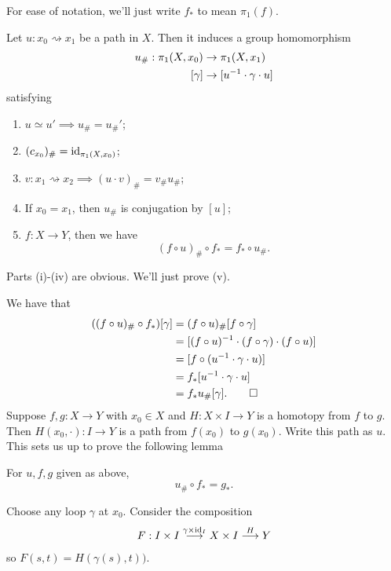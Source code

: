 \documentclass{article}
\begin{document}
\par
For ease of notation, we'll just write $ f_* $ to mean $ \pi_1(f) $.
\begin{proposition}
  Let $ u: x_0\rightsquigarrow x_1 $ be a path in $ X $. Then it induces a group homomorphism 
\begin{align*}
	u_\#: \pi_1(X,x_0) &\to \pi_1(X,x_1) \\
	[\gamma] &\to [{u}^{-1} \cdot \gamma \cdot u]
\end{align*}
satisfying
\begin{enumerate}
	\item $ u \simeq u' \implies u_\# = u_\#' $;
	\item $ (c_{x_0})_\# = \mathrm{id}_{\pi_1(X,x_0)} $;
	\item $ v: x_1\rightsquigarrow x_2\implies (u\cdot v)_\# = v_\# u_\# $;
	\item If $ x_0 = x_1 $, then $ u_\# $ is conjugation by $ [u] $;
	\item $ f:X\to Y $, then we have
		\[
			(f\circ u)_\# \circ f_* = f_* \circ u_\#.
		\]
\end{enumerate}
\end{proposition}
\pf Parts (i)-(iv) are obvious. We'll just prove (v).\par
We have that 
\begin{align*}
	((f\circ u)_\# \circ f_*)[\gamma] &= (f\circ u)_\#[f\circ \gamma] \\
					  &= [(f\circ u)^{-1} \cdot (f\circ \gamma) \cdot (f\circ u)]\\
					  &= [f\circ({u}^{-1} \cdot \gamma \cdot u)] \\
					  &= f_*[{u}^{-1} \cdot \gamma \cdot u] \\
					  &= f_* u_\#[\gamma].\qed
\end{align*}
Suppose $ f,g:X\to Y $ with $ x_0\in X $ and $ H:X\times I \to Y $ is a homotopy from $ f $ to $ g $. Then $ H(x_0, \cdot): I \to Y $ is a path from $ f(x_0) $ to $ g(x_0) $. Write this path as $ u $. This sets us up to prove the following lemma
\begin{lemma}
  For $ u,f,g $ given as above,
  \[
    u_\# \circ f_*  = g_*.
  \]
\end{lemma}
\pf Choose any loop $ \gamma $ at $ x_0 $. Consider the composition
\begin{align*}
	F: I \times I \overset{\gamma\times \mathrm{id}_I}{\longrightarrow} X\times I \overset{H}\longrightarrow Y
\end{align*}
so $ F(s,t) = H(\gamma(s),t)) $.
\end{document}
